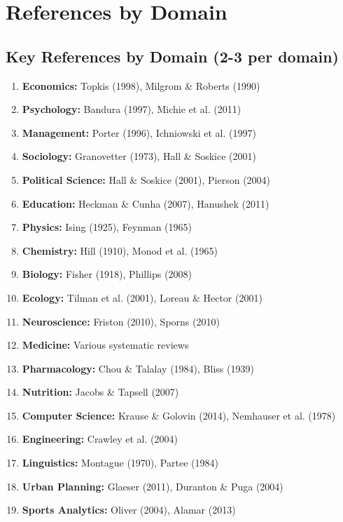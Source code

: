 \section{References by Domain}
\label{sec:references-catalog}

\subsection{Key References by Domain (2-3 per domain)}

\begin{enumerate}
    \item \textbf{Economics:} Topkis (1998), Milgrom \& Roberts (1990)
    \item \textbf{Psychology:} Bandura (1997), Michie et al. (2011)
    \item \textbf{Management:} Porter (1996), Ichniowski et al. (1997)
    \item \textbf{Sociology:} Granovetter (1973), Hall \& Soskice (2001)
    \item \textbf{Political Science:} Hall \& Soskice (2001), Pierson (2004)
    \item \textbf{Education:} Heckman \& Cunha (2007), Hanushek (2011)
    \item \textbf{Physics:} Ising (1925), Feynman (1965)
    \item \textbf{Chemistry:} Hill (1910), Monod et al. (1965)
    \item \textbf{Biology:} Fisher (1918), Phillips (2008)
    \item \textbf{Ecology:} Tilman et al. (2001), Loreau \& Hector (2001)
    \item \textbf{Neuroscience:} Friston (2010), Sporns (2010)
    \item \textbf{Medicine:} Various systematic reviews
    \item \textbf{Pharmacology:} Chou \& Talalay (1984), Bliss (1939)
    \item \textbf{Nutrition:} Jacobs \& Tapsell (2007)
    \item \textbf{Computer Science:} Krause \& Golovin (2014), Nemhauser et al. (1978)
    \item \textbf{Engineering:} Crawley et al. (2004)
    \item \textbf{Linguistics:} Montague (1970), Partee (1984)
    \item \textbf{Urban Planning:} Glaeser (2011), Duranton \& Puga (2004)
    \item \textbf{Sports Analytics:} Oliver (2004), Alamar (2013)
\end{enumerate}


